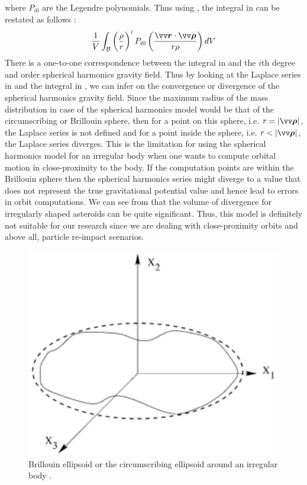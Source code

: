 where $P_{i0}$ are the Legendre polynomials. Thus using , the integral in  can be restated as follows \parencite{scheeresBook}:
\begin{align}
    \frac{1}{V} \int_{\mathcal{B}} \left(\frac{\rho}{r}\right)^i P_{i0} \left(\frac{\bvector{r} \cdot \bvector{\rho}}{r\rho}\right) dV
    \label{eqn:general_gravity_field_modified_integral}
\end{align}
There is a one-to-one correspondence between the integral in  and the $i$th degree and order spherical harmonics gravity field. Thus by looking at the Laplace series in  and the integral in , we can infer on the convergence or divergence of the spherical harmonics gravity field. Since the maximum radius of the mass distribution in case of the spherical harmonics model would be that of the circumscribing or Brillouin sphere, then for a point on this sphere, i.e. $r = |\bvector{\rho}|$, the Laplace series is not defined and for a point inside the sphere, i.e. $r < |\bvector{\rho}|$, the Laplace series diverges. This is the limitation for using the spherical harmonics model for an irregular body when one wants to compute orbital motion in close-proximity to the body. If the computation points are within the Brillouin sphere then the spherical harmonics series might diverge to a value that does not represent the true gravitational potential value and hence lead to errors in orbit computations. We can see from  that the volume of divergence for irregularly shaped asteroids can be quite significant. Thus, this model is definitely not suitable for our research since we are dealing with close-proximity orbits and above all, particle re-impact scenarios.
\begin{figure}[htb]
\centering
\captionsetup{justification=centering}
\includegraphics[width=\textwidth, height=0.25\textheight, keepaspectratio=true]{Brillouin_ellipsoid.pdf}
\caption{Brillouin ellipsoid or the circumscribing ellipsoid around an irregular body \parencite{romain2001ellipsoidal}.}
\label{fig:brillouin_ellipsoid}
\end{figure}
